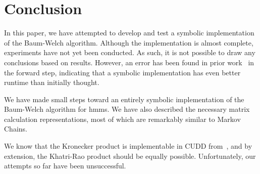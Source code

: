 % 

\section{Conclusion}\label{sec:conclusion}

In this paper, we have attempted to develop and test a symbolic implementation of the Baum-Welch algorithm.
Although the implementation is almost complete, experiments have not yet been conducted.
As such, it is not possible to draw any conclusions based on results.
However, an error has been found in prior work~\cite{p7} in the forward step, indicating that a symbolic implementation has even better runtime than initially thought.

We have made small steps toward an entirely symbolic implementation of the Baum-Welch algorithm for \glspl{hmm}.
We have also described the necessary matrix calculation representations, most of which are remarkably similar to Markov Chains.

We know that the Kronecker product is implementable in CUDD from~\cite{davidkebo-kronecker}, and by extension, the Khatri-Rao product should be equally possible.
Unfortunately, our attempts so far have been unsuccessful.